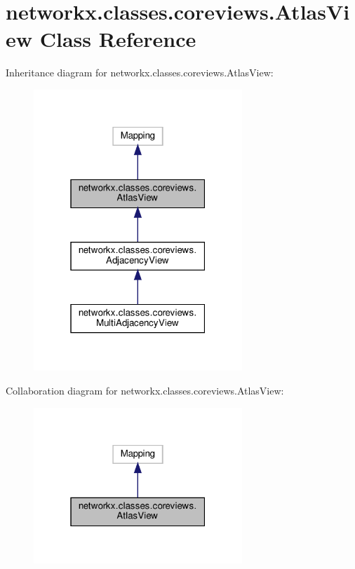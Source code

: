 \hypertarget{classnetworkx_1_1classes_1_1coreviews_1_1AtlasView}{}\section{networkx.\+classes.\+coreviews.\+Atlas\+View Class Reference}
\label{classnetworkx_1_1classes_1_1coreviews_1_1AtlasView}


Inheritance diagram for networkx.\+classes.\+coreviews.\+Atlas\+View\+:
\nopagebreak
\begin{figure}[H]
\begin{center}
\leavevmode
\includegraphics[width=223pt]{classnetworkx_1_1classes_1_1coreviews_1_1AtlasView__inherit__graph}
\end{center}
\end{figure}


Collaboration diagram for networkx.\+classes.\+coreviews.\+Atlas\+View\+:
\nopagebreak
\begin{figure}[H]
\begin{center}
\leavevmode
\includegraphics[width=223pt]{classnetworkx_1_1classes_1_1coreviews_1_1AtlasView__coll__graph}
\end{center}
\end{figure}
